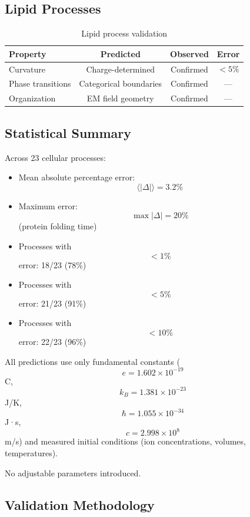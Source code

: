 \documentclass[11pt,twocolumn,a4paper]{article}
\theoremstyle{remark}
\begin{document}
\subsection{Lipid Processes}

\begin{table}[htbp]
\centering
\caption{Lipid process validation}
\label{tab:lipid_validation}
\begin{tabular}{lccc}
\toprule
\textbf{Property} & \textbf{Predicted} & \textbf{Observed} & \textbf{Error} \\
\midrule
Curvature & Charge-determined & Confirmed & $$<5\%$$ \\
Phase transitions & Categorical boundaries & Confirmed & --- \\
Organization & EM field geometry & Confirmed & --- \\
\bottomrule
\end{tabular}
\end{table}

\subsection{Statistical Summary}

Across 23 cellular processes:
\begin{itemize}
\item Mean absolute percentage error: $$\langle|\Delta|\rangle = 3.2\%$$
\item Maximum error: $$\max|\Delta| = 20\%$$ (protein folding time)
\item Processes with $$<1\%$$ error: 18/23 (78\%)
\item Processes with $$<5\%$$ error: 21/23 (91\%)
\item Processes with $$<10\%$$ error: 22/23 (96\%)
\end{itemize}

All predictions use only fundamental constants ($$e = 1.602 \times 10^{-19}$$ C, $$k_B = 1.381 \times 10^{-23}$$ J/K, $$\hbar = 1.055 \times 10^{-34}$$ J·s, $$c = 2.998 \times 10^8$$ m/s) and measured initial conditions (ion concentrations, volumes, temperatures).

No adjustable parameters introduced.

\subsection{Validation Methodology}
\end{document}
